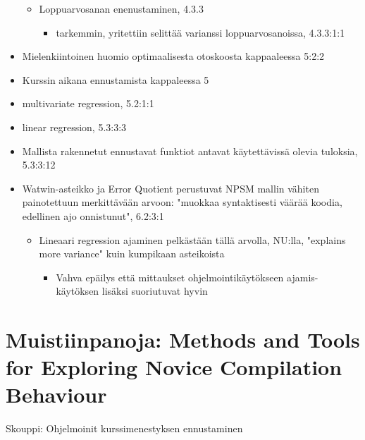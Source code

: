 \documentclass[finnish,twoside,openright]{HYgraduMLDS}
\begin{document}
\begin{itemize}
\begin{itemize}
        \item Loppuarvosanan enenustaminen, 4.3.3
        \begin{itemize}
            \item tarkemmin, yritettiin selittää varianssi loppuarvosanoissa, 4.3.3:1:1
        \end{itemize}
    \end{itemize}
    \item Mielenkiintoinen huomio optimaalisesta otoskoosta kappaaleessa 5:2:2
    \item Kurssin aikana ennustamista kappaleessa 5
    \item multivariate regression, 5.2:1:1
    \item linear regression, 5.3:3:3
    \item Mallista rakennetut ennustavat funktiot antavat käytettävissä olevia tuloksia, 5.3:3:12
    \item Watwin-asteikko ja Error Quotient perustuvat NPSM mallin vähiten painotettuun merkittävään arvoon: "muokkaa syntaktisesti väärää koodia, edellinen ajo onnistunut", 6.2:3:1
    \begin{itemize}
        \item Lineaari regression ajaminen pelkästään tällä arvolla, NU:lla, "explains more variance" kuin kumpikaan asteikoista
        \begin{itemize}
            \item Vahva epäilys että mittaukset ohjelmointikäytökseen ajamis-käytöksen lisäksi suoriutuvat hyvin
        \end{itemize}
    \end{itemize}
\end{itemize}

\section{Muistiinpanoja: Methods and Tools for Exploring Novice Compilation Behaviour\cite{jadud2006methods}}

Skouppi: Ohjelmoinit kurssimenestyksen ennustaminen
\end{document}
